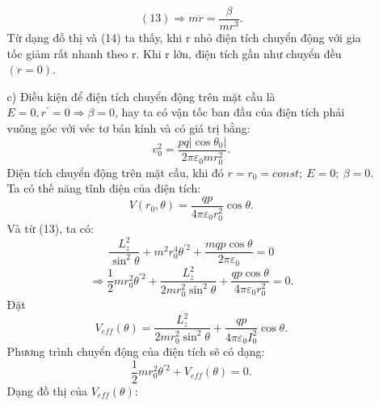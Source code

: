 \begin{loigiai}
\begin{enumerate}[1)]
\begin{enumerate}
\begin{center}

        \end{center}
        \[(13)\Rightarrow {m}\ddot{r}=\frac{\beta }{{m}{{{r}}^{3}}}.\]
        Từ dạng đồ thị và (14) ta thấy, khi r nhỏ điện tích chuyển động với gia tốc giảm rất nhanh theo r. Khi r lớn, điện tích gần như chuyển đều $({\ddot{{r}}}=0)$.
            \item[c)] Điều kiện để điện tích chuyển động trên mặt cầu là ${E}=0,{{{r}}^{\prime }}=0\Rightarrow \beta =0$, hay ta có vận tốc ban đầu của điện tích phải vuông góc với véc tơ bán kính và có giá trị bằng:
            \[v_{0}^{2}=\frac{pq\left| \cos {{\theta }_{0}} \right|}{2\pi {{\varepsilon }_{0}}mr_{0}^{2}}.\]
            Điện tích chuyển động trên mặt cầu, khi đó ${r}={{{r}}_{0}}=const;~{E}=0;~\beta =0$. 
            \\Ta có thế năng tĩnh điện của điện tích:
            \[{V}\left( {{{r}}_{0}},\theta  \right)=\frac{{qp}}{4\pi {{\varepsilon }_{0}}{r}_{0}^{2}}\cos \theta.\]
            Và từ (13), ta có:
            \[\frac{{L}_{z}^{2}}{{{\sin }^{2}}\theta }+{{{m}}^{2}}r_{0}^{4}{{\theta }^{\prime 2}}+\frac{{mqp}\cos \theta }{2\pi {{\varepsilon }_{0}}}=0\]\[\Rightarrow \frac{1}{2}{mr}_{0}^{2}{{\theta }^{\prime 2}}+\frac{{L}_{z}^{2}}{2{mr}_{0}^{2}{{\sin }^{2}}\theta }+\frac{{qp}\cos \theta }{4\pi {{\varepsilon }_{0}}{r}_{0}^{2}}=0.\]	
            Đặt \[{{{V}}_{{eff}}}(\theta )=\frac{{L}_{z}^{2}}{2{mr}_{0}^{2}{{\sin }^{2}}\theta }+\frac{{qp}}{4\pi {{\varepsilon }_{0}}{I}_{0}^{2}}\cos \theta.\]
            Phương trình chuyển động của điện tích sẽ có dạng:
            \[\frac{1}{2}{mr}_{0}^{2}{{\theta }^{\prime 2}}+{{{V}}_{{eff}}}(\theta )=0.\]
            Dạng đồ thị của ${{{V}}_{{eff}}}(\theta )$:
            \begin{center}
 


\begin{tikzpicture}[x=0.75pt,y=0.75pt,yscale=-1,xscale=1]


\end{tikzpicture}
\end{center}
\end{enumerate}
\end{enumerate}
\end{loigiai}
